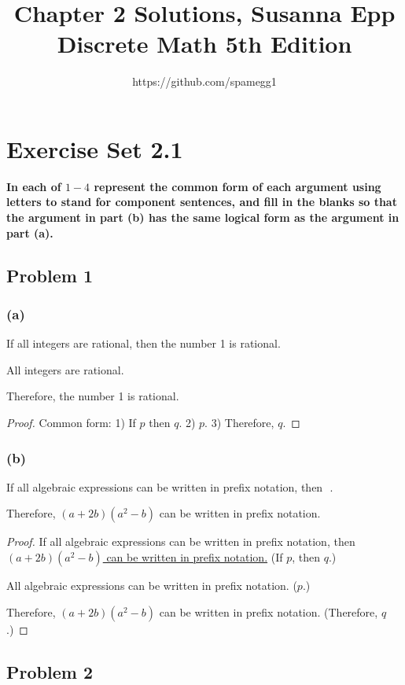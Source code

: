\documentclass[14pt]{extarticle}
\title{Chapter 2 Solutions, Susanna Epp Discrete Math 5th Edition}
\author{https://github.com/spamegg1}
\newcommand{\fbl}{\underline{\hspace{1cm}}\,\,}
\begin{document}
\maketitle
\tableofcontents

\section {Exercise Set 2.1}
{\bf In each of $1-4$ represent the common form of each argument using letters to stand for component sentences, and fill in the blanks so that the argument in part (b) has the same logical form as the argument in part (a).}

\subsection{Problem 1}
\subsubsection{(a)}
If all integers are rational, then the number 1 is rational.

All integers are rational.

Therefore, the number 1 is rational.

\begin{proof}
Common form: 1) If $p$ then $q$. 2) $p$. 3) Therefore, $q$.
\end{proof}

\subsubsection{(b)}
If all algebraic expressions can be written in prefix notation, then \fbl.

Therefore, $(a + 2b)(a^2 - b)$ can be written in prefix notation.

\begin{proof}
If all algebraic expressions can be written in prefix notation, then \\
\underline{$(a + 2b)(a^2 - b)$ can be written in prefix notation.} (If $p$, then $q$.)

All algebraic expressions can be written in prefix notation. ($p$.)

Therefore, $(a + 2b)(a^2 - b)$ can be written in prefix notation. (Therefore, $q$.)
\end{proof}

\subsection{Problem 2}
\end{document}
